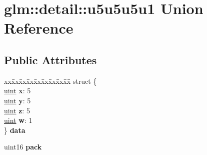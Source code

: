 \hypertarget{unionglm_1_1detail_1_1u5u5u5u1}{}\section{glm\+:\+:detail\+:\+:u5u5u5u1 Union Reference}
\label{unionglm_1_1detail_1_1u5u5u5u1}
\subsection*{Public Attributes}
\begin{DoxyCompactItemize}
\item 
\mbox{\label{unionglm_1_1detail_1_1u5u5u5u1_a900aa35cb1048e63ac8aebb5ca69d0a5}} 
\begin{tabbing}
xx\=xx\=xx\=xx\=xx\=xx\=xx\=xx\=xx\=\kill
struct \{\\
\mbox{\label{unionglm_1_1detail_1_1u5u5u5u1_a1e915b4e149793aaad0bbbe112aeaddc}} 
\hyperlink{group__core__precision_ga4fd29415871152bfb5abd588334147c8}{uint} {\bfseries x}: 5\\
\mbox{\label{unionglm_1_1detail_1_1u5u5u5u1_a2618a876898614f020e00c8466e647fe}} 
\hyperlink{group__core__precision_ga4fd29415871152bfb5abd588334147c8}{uint} {\bfseries y}: 5\\
\mbox{\label{unionglm_1_1detail_1_1u5u5u5u1_aee09cb6a7c2bfd1be9dd80a4cc3c5433}} 
\hyperlink{group__core__precision_ga4fd29415871152bfb5abd588334147c8}{uint} {\bfseries z}: 5\\
\mbox{\label{unionglm_1_1detail_1_1u5u5u5u1_a23b703d552a7fbdee765d04ad357bf7d}} 
\hyperlink{group__core__precision_ga4fd29415871152bfb5abd588334147c8}{uint} {\bfseries w}: 1\\
\} {\bfseries data}\\

\end{tabbing}\item 
\mbox{\label{unionglm_1_1detail_1_1u5u5u5u1_acbc99680c58046aeb5c4f2b284680a8b}} 
uint16 {\bfseries pack}
\end{DoxyCompactItemize}


